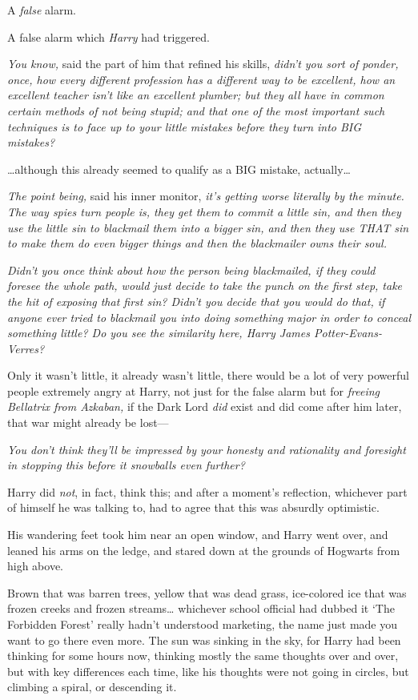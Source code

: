 A \emph{false} alarm.

A false alarm which \emph{Harry} had triggered.

\emph{You know,} said the part of him that refined his skills, \emph{didn't you 
sort of ponder, once, how every different profession has a different way to be 
excellent, how an excellent teacher isn't like an excellent plumber; but they 
all have in common certain methods of not being stupid; and that one of the 
most important such techniques is to face up to your little mistakes before 
they turn into BIG mistakes?}

{\ldots}although this already seemed to qualify as a BIG mistake, 
actually{\ldots}

\emph{The point being,} said his inner monitor, \emph{it's getting worse 
literally by the minute. The way spies turn people is, they get them to commit 
a little sin, and then they use the little sin to blackmail them into a bigger 
sin, and then they use THAT sin to make them do even bigger things and then the 
blackmailer owns their soul.}

\emph{Didn't you once think about how the person being blackmailed, if they 
could foresee the whole path, would just decide to take the punch on the first 
step, take the hit of exposing that first sin? Didn't you decide that you would 
do that, if anyone ever tried to blackmail you into doing something major in 
order to conceal something little? Do you see the similarity here, Harry James 
Potter-Evans-Verres?}

Only it wasn't little, it already wasn't little, there would be a lot of very 
powerful people extremely angry at Harry, not just for the false alarm but for 
\emph{freeing Bellatrix from Azkaban,} if the Dark Lord \emph{did} exist and 
did come after him later, that war might already be lost---

\emph{You don't think they'll be impressed by your honesty and rationality and 
foresight in stopping this before it snowballs even further?}

Harry did \emph{not}, in fact, think this; and after a moment's reflection, 
whichever part of himself he was talking to, had to agree that this was 
absurdly optimistic.

His wandering feet took him near an open window, and Harry went over, and 
leaned his arms on the ledge, and stared down at the grounds of Hogwarts from 
high above.

Brown that was barren trees, yellow that was dead grass, ice-colored ice that 
was frozen creeks and frozen streams{\ldots} whichever school official had 
dubbed it `The Forbidden Forest' really hadn't understood marketing, the name 
just made you want to go there even more. The sun was sinking in the sky, for 
Harry had been thinking for some hours now, thinking mostly the same thoughts 
over and over, but with key differences each time, like his thoughts were not 
going in circles, but climbing a spiral, or descending it.

